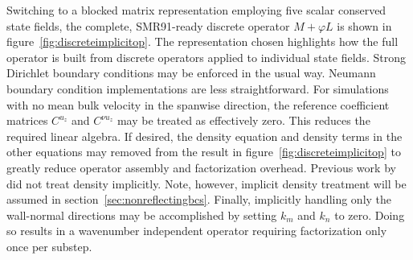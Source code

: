 \documentclass[letterpaper,11pt,nointlimits,reqno,draft]{amsart}
\begin{document}
Switching to a blocked matrix representation employing five scalar conserved
state fields, the complete, SMR91-ready discrete operator $M+\varphi{}L$ is
shown in figure~\vref{fig:discreteimplicitop}.  The representation chosen
highlights how the full operator is built from discrete operators applied to
individual state fields.  Strong Dirichlet boundary conditions may be enforced
in the usual way.  Neumann boundary condition implementations are less
straightforward.  For simulations with no mean bulk velocity in the spanwise
direction, the reference coefficient matrices $C^{u_z}$ and $C^{\nu{}u_z}$ may
be treated as effectively zero.  This reduces the required linear algebra.  If
desired, the density equation and density terms in the other equations may
removed from the result in figure~\ref{fig:discreteimplicitop} to greatly
reduce operator assembly and factorization overhead.  Previous work by
\citet{Guarini1998} did not treat density implicitly.  Note, however, implicit
density treatment will be assumed in section~\ref{sec:nonreflectingbcs}.
Finally, implicitly handling only the wall-normal directions may be
accomplished by setting $k_{m}$ and $k_{n}$ to zero.  Doing so results in a
wavenumber independent operator requiring factorization only once per substep.
\end{document}
